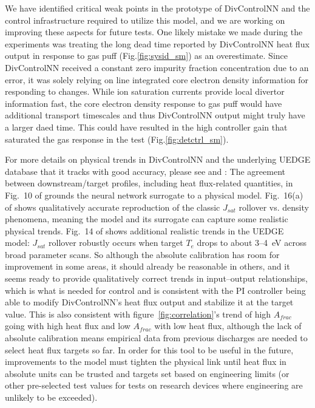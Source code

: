 \documentclass[10pt]{iopart}
\begin{document}
We have identified critical weak points in the prototype of DivControlNN and the control infrastructure required to utilize this model, and we are working on improving these aspects for future tests.
One likely mistake we made during the experiments was treating the long dead time reported by DivControlNN heat flux output in response to gas puff (Fig.\ref{fig:sysid_sm}) as an overestimate.
Since DivControlNN received a constant zero impurity fraction concentration due to an error, it was solely relying on line integrated core electron density information for responding to changes.
While ion saturation currents provide local divertor information fast, the core electron density response to gas puff would have additional transport timescales and thus DivControlNN output might truly have a larger daed time.
This could have resulted in the high controller gain that saturated the gas response in the test (Fig.\ref{fig:detctrl_sm}).

For more details on physical trends in DivControlNN and the underlying UEDGE database that it tracks with good accuracy, please see \cite{zhu_2025_pop} and \cite{zhao_2026_nf}:
The agreement between downstream/target profiles, including heat flux-related quantities, in Fig.~10 of \cite{zhu_2025_pop} grounds the neural network surrogate to a physical model.
Fig.~16(a) of \cite{zhu_2025_pop} shows qualitatively accurate reproduction of the classic \cite{loarte_1998_nf} $J_{sat}$ rollover vs. density phenomena, meaning the model and its surrogate can capture some realistic physical trends.
Fig.~14 of \cite{zhao_2026_nf} shows additional realistic trends in the UEDGE model: $J_{sat}$ rollover robustly occurs when target $T_e$ drops to about 3--4~eV across broad parameter scans.
So although the absolute calibration has room for improvement in some areas, it should already be reasonable in others, and it seems ready to provide qualitatively correct trends in input--output relationships, which is what is needed for control and is consistent with the PI controller being able to modify DivControlNN's heat flux output and stabilize it at the target value.
This is also consistent with figure~\ref{fig:correlation}'s trend of high $A_{frac}$ going with high heat flux and low $A_{frac}$ with low heat flux, although the lack of absolute calibration means empirical data from previous discharges are needed to select heat flux targets so far.
In order for this tool to be useful in the future, improvements to the model must tighten the physical link until heat flux in absolute units can be trusted and targets set based on engineering limits (or other pre-selected test values for tests on research devices where engineering are unlikely to be exceeded).
\end{document}
